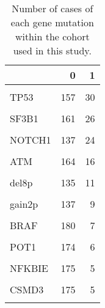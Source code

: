 \documentclass[11pt, a4paper, twosided]{book}
\begin{document}
\begin{table}

\caption{\label{tab:geneTable}Number of cases of each gene mutation within the cohort used in this study. }
\centering
\fontsize{7}{9}\selectfont
\begin{tabular}[t]{l|r|r}
\hline
  & 0 & 1\\
\hline
\cellcolor[HTML]{E2E868}{del13q} & \cellcolor[HTML]{E2E868}{66} & \cellcolor[HTML]{E2E868}{108}\\
\hline
TP53 & 157 & 30\\
\hline
\cellcolor[HTML]{E2E868}{del11q} & \cellcolor[HTML]{E2E868}{148} & \cellcolor[HTML]{E2E868}{28}\\
\hline
SF3B1 & 161 & 26\\
\hline
\cellcolor[HTML]{E2E868}{trisomy12} & \cellcolor[HTML]{E2E868}{149} & \cellcolor[HTML]{E2E868}{25}\\
\hline
NOTCH1 & 137 & 24\\
\hline
\cellcolor[HTML]{E2E868}{del17p} & \cellcolor[HTML]{E2E868}{154} & \cellcolor[HTML]{E2E868}{20}\\
\hline
ATM & 164 & 16\\
\hline
\cellcolor[HTML]{E2E868}{gain8q} & \cellcolor[HTML]{E2E868}{159} & \cellcolor[HTML]{E2E868}{13}\\
\hline
del8p & 135 & 11\\
\hline
\cellcolor[HTML]{E2E868}{MED12} & \cellcolor[HTML]{E2E868}{170} & \cellcolor[HTML]{E2E868}{10}\\
\hline
gain2p & 137 & 9\\
\hline
\cellcolor[HTML]{E2E868}{KRAS} & \cellcolor[HTML]{E2E868}{177} & \cellcolor[HTML]{E2E868}{7}\\
\hline
BRAF & 180 & 7\\
\hline
\cellcolor[HTML]{E2E868}{del6q} & \cellcolor[HTML]{E2E868}{166} & \cellcolor[HTML]{E2E868}{7}\\
\hline
POT1 & 174 & 6\\
\hline
\cellcolor[HTML]{E2E868}{del9p} & \cellcolor[HTML]{E2E868}{140} & \cellcolor[HTML]{E2E868}{6}\\
\hline
NFKBIE & 175 & 5\\
\hline
\cellcolor[HTML]{E2E868}{FAT2} & \cellcolor[HTML]{E2E868}{175} & \cellcolor[HTML]{E2E868}{5}\\
\hline
CSMD3 & 175 & 5\\
\hline
\cellcolor[HTML]{E2E868}{del1q} & \cellcolor[HTML]{E2E868}{141} & \cellcolor[HTML]{E2E868}{5}\\

\end{tabular}
\end{table}
\end{document}
